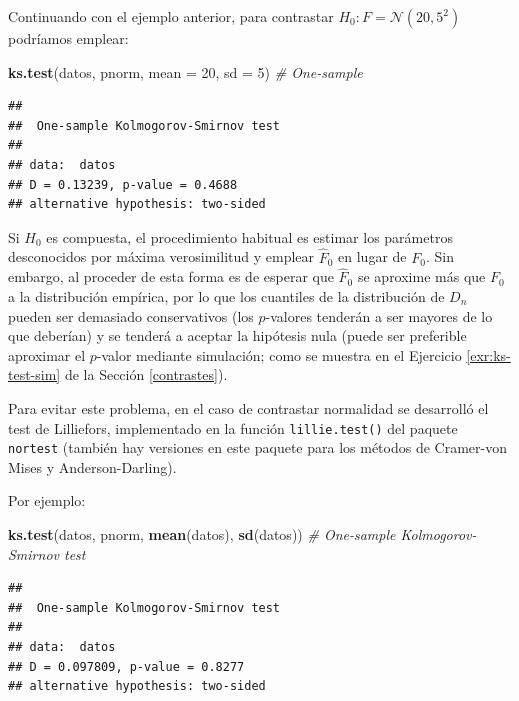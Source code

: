 \documentclass[
]{book}
\newenvironment{Shaded}{\begin{snugshade}}{\end{snugshade}}
\newcommand{\CommentTok}[1]{\textcolor[rgb]{0.56,0.35,0.01}{\textit{#1}}}
\newcommand{\DataTypeTok}[1]{\textcolor[rgb]{0.13,0.29,0.53}{#1}}
\newcommand{\DecValTok}[1]{\textcolor[rgb]{0.00,0.00,0.81}{#1}}
\newcommand{\KeywordTok}[1]{\textcolor[rgb]{0.13,0.29,0.53}{\textbf{#1}}}
\newcommand{\NormalTok}[1]{#1}
\theoremstyle{break}
\theoremstyle{definition}
\theoremstyle{definition}
\theoremstyle{definition}
\theoremstyle{remark}
\begin{document}
Continuando con el ejemplo anterior, para contrastar \(H_0:F= \mathcal{N}(20,5^2)\) podríamos emplear:

\begin{Shaded}
\begin{Highlighting}[]
\KeywordTok{ks.test}\NormalTok{(datos, pnorm, }\DataTypeTok{mean =} \DecValTok{20}\NormalTok{, }\DataTypeTok{sd =} \DecValTok{5}\NormalTok{) }\CommentTok{# One-sample }
\end{Highlighting}
\end{Shaded}

\begin{verbatim}
## 
##  One-sample Kolmogorov-Smirnov test
## 
## data:  datos
## D = 0.13239, p-value = 0.4688
## alternative hypothesis: two-sided
\end{verbatim}

Si \(H_0\) es compuesta, el procedimiento habitual es estimar los parámetros desconocidos
por máxima verosimilitud y emplear \(\hat{F}_0\) en lugar de \(F_0\).
Sin embargo, al proceder de esta forma es de esperar que \(\hat{F}_0\) se aproxime más
que \(F_0\) a la distribución empírica, por lo que los cuantiles de la distribución de
\(D_n\) pueden ser demasiado conservativos (los \(p\)-valores tenderán a ser mayores de
lo que deberían) y se tenderá a aceptar la hipótesis nula (puede ser preferible aproximar el \(p\)-valor mediante simulación; como se muestra en el Ejercicio \ref{exr:ks-test-sim} de la Sección \ref{contrastes}).

Para evitar este problema, en el caso de contrastar normalidad se desarrolló el test
de Lilliefors, implementado en la función \texttt{lillie.test()} del paquete \texttt{nortest}
(también hay versiones en este paquete para los métodos de Cramer-von Mises y
Anderson-Darling).

Por ejemplo:

\begin{Shaded}
\begin{Highlighting}[]
\KeywordTok{ks.test}\NormalTok{(datos, pnorm, }\KeywordTok{mean}\NormalTok{(datos), }\KeywordTok{sd}\NormalTok{(datos)) }\CommentTok{# One-sample Kolmogorov-Smirnov test}
\end{Highlighting}
\end{Shaded}

\begin{verbatim}
## 
##  One-sample Kolmogorov-Smirnov test
## 
## data:  datos
## D = 0.097809, p-value = 0.8277
## alternative hypothesis: two-sided
\end{verbatim}
\end{document}
